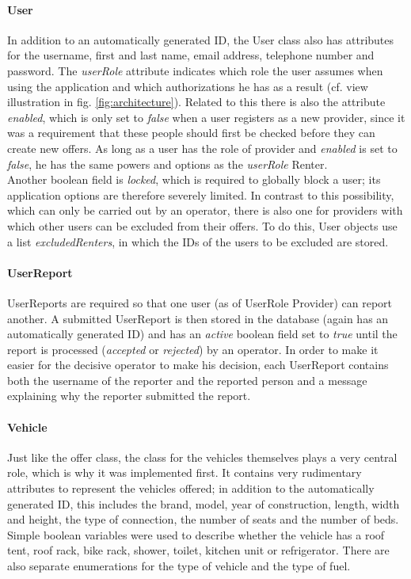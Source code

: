 \paragraph{User}
In addition to an automatically generated ID, the User class also has attributes for the username, first and last name, email address, telephone number and password. The \textit{userRole} attribute indicates which role the user assumes when using the application and which authorizations he has as a result (cf. view illustration in fig. \ref{fig:architecture}). Related to this there is also the attribute \textit{enabled}, which is only set to \textit{false} when a user registers as a new provider, since it was a requirement that these people should first be checked before they can create new offers. As long as a user has the role of provider and \textit{enabled} is set to \textit{false}, he has the same powers and options as the \textit{userRole} Renter. \\
Another boolean field is \textit{locked}, which is required to globally block a user; its application options are therefore severely limited. In contrast to this possibility, which can only be carried out by an operator, there is also one for providers with which other users can be excluded from their offers. To do this, User objects use a list \textit{excludedRenters}, in which the IDs of the users to be excluded are stored.

\paragraph{UserReport}
UserReports are required so that one user (as of UserRole Provider) can report another. A submitted UserReport is then stored in the database (again has an automatically generated ID) and has an \textit{active} boolean field set to \textit{true} until the report is processed (\textit{accepted} or \textit{rejected}) by an operator. In order to make it easier for the decisive operator to make his decision, each UserReport contains both the username of the reporter and the reported person and a message explaining why the reporter submitted the report.

\paragraph{Vehicle}
Just like the offer class, the class for the vehicles themselves plays a very central role, which is why it was implemented first. It contains very rudimentary attributes to represent the vehicles offered; in addition to the automatically generated ID, this includes the brand, model, year of construction, length, width and height, the type of connection, the number of seats and the number of beds. Simple boolean variables were used to describe whether the vehicle has a roof tent, roof rack, bike rack, shower, toilet, kitchen unit or refrigerator. There are also separate enumerations for the type of vehicle and the type of fuel.

